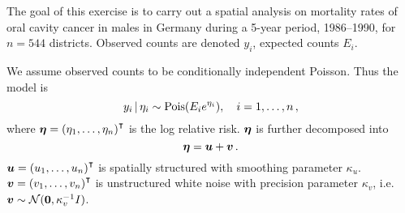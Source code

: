 \section*{}
\label{sec:intro}

The goal of this exercise is to carry out a spatial analysis on mortality rates of oral cavity cancer in males in Germany during a 5-year period, 1986–1990, for $n = 544$ districts. Observed counts are denoted $y_i$, expected counts $E_i$.

We assume observed counts to be conditionally independent Poisson. Thus the model is
%
\begin{equation*}
    y_i \, | \, \eta_i \sim \mathrm{Pois}(E_i e^{\eta_i}), \quad i = 1, \dots, n \, ,
\end{equation*}
%
where $\bm{\eta} = ({\eta_1, \dots, \eta_n)}^\intercal$ is the log relative risk. $\bm{\eta}$ is further decomposed into
%
\begin{equation*}
    \bm{\eta} = \bm{u} + \bm{v} \, .
\end{equation*}
%
$\bm{u} = {(u_1, \dots, u_n)}^\intercal$ is spatially structured with smoothing parameter $\kappa_u$. $\bm{v} = {(v_1, \dots, v_n)}^\intercal$ is unstructured white noise with precision parameter $\kappa_v$, i.e. $\bm{v} \sim \mathcal{N}(\bm{0}, \kappa_v^{-1}I)$.


